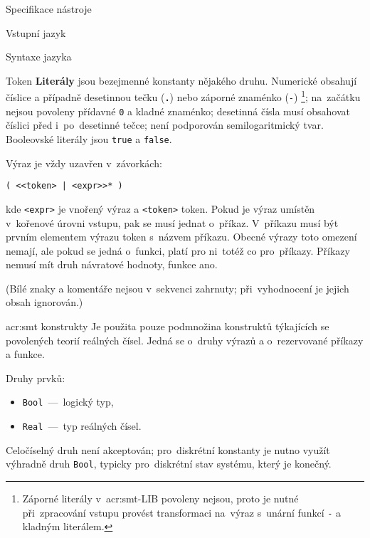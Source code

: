 \documentclass[thesis=M,czech]{FITthesis}[2012/06/26]
\newcommand{\acrlabel}[1]{acr:#1}
\newcommand{\acr}[1]{\acrshort{\acrlabel{#1}}}
\newcommand{\id}[1]{\texttt{#1}}
\newcommand{\hll}[1]{\textbf{#1}}
\begin{document}
\begin{section}{Specifikace nástroje}
\begin{subsection}{Vstupní jazyk}
\begin{subsubsection}{Syntaxe jazyka}
\begin{paragraph}{Token}
\hll{Literály} jsou bezejmenné konstanty
nějakého druhu.
Numerické obsahují číslice a případně desetinnou tečku (\id{\hll{.}})
nebo záporné znaménko (\id{-})%
\footnote{Záporné literály v~\acr{smt}-LIB povoleny nejsou,
proto je nutné při~zpracování vstupu
provést transformaci na~výraz
s~unární funkcí \id{-} a kladným literálem.};
na~začátku nejsou povoleny přídavné \id{0} a kladné znaménko;
desetinná čísla musí obsahovat číslici před i~po~desetinné tečce;
není podporován semilogaritmický tvar.
Booleovské literály jsou \id{true} a \id{false}.
\end{paragraph} %


\begin{paragraph}{Výraz}\label{p:design:spec:ilang:struct:expr}
je vždy uzavřen v~závorkách:
\begin{center}
\id{( <{}<token> | <expr>{}>* )}
\end{center}
kde \id{<expr>} je vnořený výraz
a \id{<token>} token.
Pokud je výraz umístěn v~kořenové úrovni vstupu,
pak se musí jednat o~příkaz.
V~příkazu musí být prvním elementem výrazu
token s~názvem příkazu.
Obecné výrazy toto omezení nemají,
ale pokud se jedná o~funkci,
platí pro ni~totéž co pro~příkazy.
Příkazy nemusí mít druh návratové hodnoty,
funkce ano.

(Bílé znaky a komentáře nejsou v~sekvenci zahrnuty;
při~vyhodnocení je jejich obsah ignorován.)
\end{paragraph} %


\end{subsubsection} %


\begin{subsubsection}{\acr{smt} konstrukty}\label{sss:design:spec:ilang:smt}
Je použita pouze podmnožina konstruktů
týkajících se povolených teorií reálných čísel.
Jedná se o~druhy výrazů
a o~rezervované příkazy a funkce.


\begin{paragraph}{Druhy prvků:}\label{p:design:spec:ilang:smt:sorts}
\begin{itemize}
\item \id{Bool}~---~logický typ,
\item \id{Real}~---~typ reálných čísel.
\end{itemize}
Celočíselný druh není akceptován;
pro~diskrétní konstanty je nutno využít výhradně druh \id{Bool},
typicky pro~diskrétní stav systému, který je konečný.
\end{paragraph} %


\end{subsubsection}
\end{subsection}
\end{section}
\end{document}
